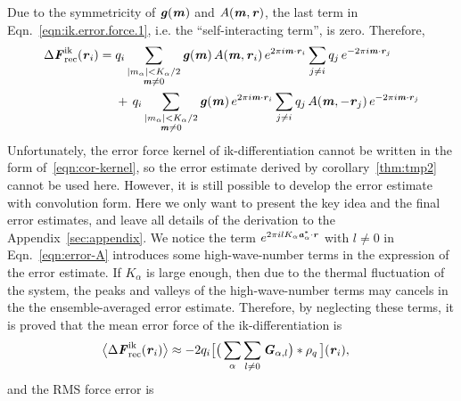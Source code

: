 \documentclass[aps,pre,preprint,unsortedaddress]{revtex4}
\renewcommand{\v}[1]{\textbf{\textit{#1}}}
\begin{document}
Due to the symmetricity of $\v g(\v m)$ and $A(\v m, \v r)$,
the last term in Eqn.~\eqref{eqn:ik.error.force.1},
i.e. the ``self-interacting term'', is zero.
Therefore,
\begin{align}\nonumber
  \Delta\v F_{\textrm{rec}}^{\textrm{ik}}(\v r_i)
  =\;&
  q_i
  \sum_{
    \begin{subarray}{c}
      \vert m_{\alpha}\vert < K_\alpha/2\\
      \v m\neq 0
    \end{subarray}}
  \v g(\v m)\,
  A(\v m, \v r_i)\,
  e^{2\pi i\v m\cdot \v r_i}
  \sum_{j\neq i}q_j\,e^{-2\pi i\v m\cdot\v r_j} \\\label{eqn:ik.error.force}
  & +\,
  q_i
  \sum_{
    \begin{subarray}{c}
      \vert m_{\alpha}\vert < K_\alpha/2\\
      \v m\neq 0
    \end{subarray}}
  \v g(\v m)\,
  e^{2\pi i\v m\cdot \v r_i}
  \sum_{j\neq i}q_j\,A(\v m, -\v r_j)\,e^{-2\pi i\v m\cdot\v r_j}
\end{align}
Unfortunately, the
error force kernel of ik-differentiation
cannot be written
in the form of~\eqref{eqn:cor-kernel}, so the error estimate derived by
corollary~\ref{thm:tmp2} cannot be used here. However, it is still
possible to develop the error estimate with convolution form.
Here we only want to present the key idea and the final  error
estimates, and leave all details of the derivation 
to the Appendix~\ref{sec:appendix}.  We notice the
term $e^{2\pi i l K_\alpha\v a^\ast_\alpha\cdot\v r}$ with $l\neq 0$
in Eqn.~\eqref{eqn:error-A} introduces some high-wave-number terms in
the expression of the error estimate.  If $K_\alpha$ is large enough,
then due to the thermal fluctuation of the system, the peaks and
valleys of the high-wave-number terms may cancels in the the
ensemble-averaged error estimate.
Therefore, by neglecting these terms, it is proved that the mean error
force of the ik-differentiation is
\begin{align}\label{eqn:ik.meanf}
  \big\langle
  \Delta\v F_{\textrm{rec}}^{\textrm{ik}}(\v r_i)
  \big\rangle
  & \approx
  - 2 q_i
  \big[
  \big(
  \sum_{\alpha}\sum_{l\neq 0}\v G_{\alpha,l}
  \big)
  \ast\rho_q\,
  \big] (\v r_i),
\end{align}
and the RMS force error is 
\end{document}
